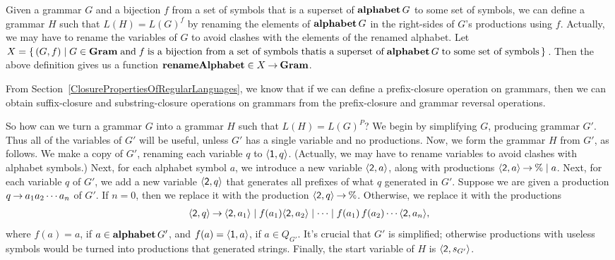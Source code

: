 Given a grammar $G$ and a bijection $f$ from a set of symbols that is
a superset of $\mathbf{alphabet}\,G$ to some set of symbols, we can define a
grammar $H$ such that $L(H)=L(G)^f$ by renaming the elements of
%
%
%
$\mathbf{alphabet}\,G$ in the right-sides of $G$'s productions using $f$.
Actually, we may have to rename the variables of $G$ to avoid clashes
with the elements of the renamed alphabet.  Let
$X=\{ \, (G,f) \mid G\in\mathbf{Gram}\;\allowbreak\mbox{and}\allowbreak\;f\;\allowbreak\mbox{is a bijection from a
    set of symbols that}\allowbreak\allowbreak\mbox{is a superset
    of}\allowbreak\;\mathbf{alphabet}\,G\;\allowbreak\mbox{to some set of symbols}\allowbreak \, \}$.  Then the above
definition gives us a function
$\mathbf{renameAlphabet}\in X\mathbin{\to}\mathbf{Gram}$.
%

From Section~\ref{ClosurePropertiesOfRegularLanguages},
we know that if we can define a prefix-closure operation
%
%
%
%
%
%
%
%
%
on grammars, then we can obtain suffix-closure and substring-closure
operations on grammars from the prefix-closure and grammar reversal
operations.

So how can we turn a grammar $G$ into a grammar $H$ such that
$L(H)=L(G)^P$?
We begin by simplifying $G$, producing grammar $G'$.
Thus all of the variables of $G'$ will be useful, unless $G'$ has
a single variable and no productions.  Now, we form the grammar $H$
from $G'$, as follows.
We make a copy of $G'$, renaming each variable $q$ to
$\langle\mathsf{1},q\rangle$.  (Actually, we may have to rename variables
to avoid clashes with alphabet symbols.)
Next, for each alphabet symbol $a$, we introduce a new variable
$\langle\mathsf{2},a\rangle$, along with productions
$\langle\mathsf{2},a\rangle\mathbin{\to}\%\mid a$.
Next, for each variable $q$ of $G'$, we add a new variable
$\langle\mathsf{2},q\rangle$ that generates all prefixes of what $q$
generated in $G'$.  Suppose we are given a production $q\mathbin{\to}
a_1a_2\cdots a_n$ of $G'$.  If $n=0$, then we replace it with the
production $\langle\mathsf{2},q\rangle\mathbin{\to}\%$.  Otherwise, we replace it
with the productions
\begin{gather*}
\langle\mathsf{2},q\rangle\mathbin{\to}
\langle\mathsf{2},a_1\rangle \mid
f(a_1)\langle\mathsf{2},a_2\rangle \mid \cdots \mid
f(a_1)\,f(a_2)\cdots\langle\mathsf{2},a_n\rangle ,
\end{gather*}
where $f(a) = a$, if $a\in\mathbf{alphabet}\,G'$, and
$f(a)=\langle\mathsf{1},a\rangle$, if $a\in Q_{G'}$.  It's crucial that
$G'$ is simplified; otherwise productions with useless symbols would
be turned into productions that generated strings. Finally, the start
variable of $H$ is $\langle\mathsf{2},s_{G'}\rangle$.

